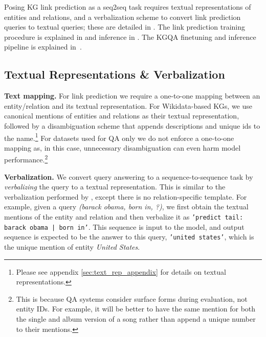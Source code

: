 \documentclass[11pt]{article}
\renewcommand\:{\colon} \newcommand{\sset}[1]{\left\{\,#1\,\right\}} \newcommand{\ssets}[1]{\left\{#1\right\}} \newcommand{\ssetn}[1]{\{\,#1\,\}}
\begin{document}
Posing KG link prediction as a seq2seq task requires textual representations of entities and relations, and a verbalization scheme to convert link prediction queries to textual queries; these are detailed in .
The link prediction training procedure is explained in  and inference in . The KGQA finetuning and inference pipeline is explained in~.














\subsection{Textual Representations \& Verbalization}
\label{sec:query_verbalization}
\textbf{Text mapping.} For link prediction we require a one-to-one mapping between an entity/relation and its textual representation.
For Wikidata-based KGs, we use canonical mentions of entities and relations as their textual representation, followed by a disambiguation scheme that appends descriptions and unique ids to the name.\footnote{Please see appendix \ref{sec:text_rep_appendix} for details on textual representations.}
For datasets used for QA only we do not enforce a one-to-one mapping as, in this case, unnecessary disambiguation can even harm model performance.\footnote{This is because QA systems consider surface forms during evaluation, not entity IDs. For example, it will be better to have the same mention for both the single and album version of a song rather than append a unique number to their mentions.}


\noindent\textbf{Verbalization.} We convert  query answering to a sequence-to-sequence task by \textit{verbalizing} the query  to a textual representation. This is similar to the verbalization performed by \citet{lama}, except there is no relation-specific template. For example, given a query \textit{(barack obama, born in, ?)}, we first obtain the textual mentions of the entity and relation and then verbalize it as 
\texttt{'predict tail: barack obama | born in'}. This sequence is input to the model, and output sequence is expected to be the answer to this query, \texttt{'united states'}, which is the unique mention of entity \textit{United States}. 
\end{document}
